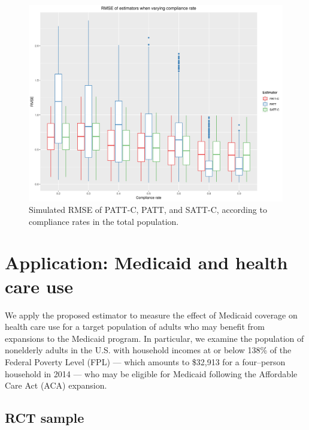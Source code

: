 \documentclass[hidelinks,12pt]{article}
\begin{document}
{%

\begin{figure}[htbp] %
\begin{center}
\includegraphics[width = 1\textwidth]{rmse_boxplots_rateC}
\caption{Simulated RMSE of PATT-C, PATT, and SATT-C, according to compliance rates in the total population.\label{fig:rmse_boxplots_rateC}}
\end{center}
\end{figure}

\section{Application: Medicaid and health care use} \label{application}

We apply the proposed estimator to measure the effect of Medicaid coverage on health care use for a target population of adults who may benefit from expansions to the Medicaid program. In particular, we examine the population of nonelderly adults in the U.S. with household incomes at or below 138\% of the Federal Poverty Level (FPL) --- which amounts to \$32,913 for a four--person household in 2014 --- who may be eligible for Medicaid following the Affordable Care Act (ACA) expansion.

\subsection{RCT sample} 

}
\end{document}
